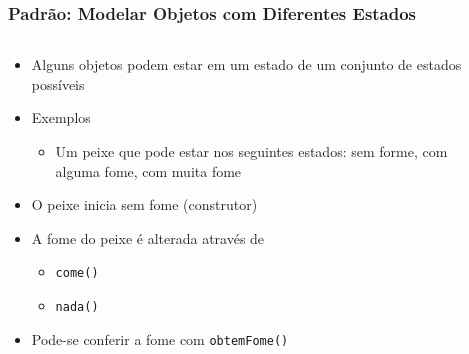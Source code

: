 \documentclass[xcolor={dvipsnames,table},aspectratio=169]{beamer}
\begin{document}
\begin{frame}[fragile]\frametitle{Padrão: Modelar Objetos com Diferentes Estados}
\begin{columns}[T]
	\begin{column}{0.5\linewidth}
\begin{itemize}
	\item Alguns objetos podem estar em um estado de um conjunto de estados possíveis
	\item Exemplos
	\begin{itemize}
		\item Um peixe que pode estar nos seguintes estados: sem forme, com alguma fome, com muita fome
	\end{itemize}
	\item O peixe inicia sem fome (construtor)	
	\item A fome do peixe é alterada através de
	\begin{itemize}
		\item \texttt{come()}
		\item \texttt{nada()}
	\end{itemize}
	\item Pode-se conferir a fome com \texttt{obtemFome()}
\end{itemize}
	\end{column}
	\begin{column}{0.5\linewidth}
{\tiny\inputminted[bgcolor=cyan!10]{java}{src/peixe/Peixe.java}}
	\end{column}
\end{columns}
\end{frame}
\end{document}
